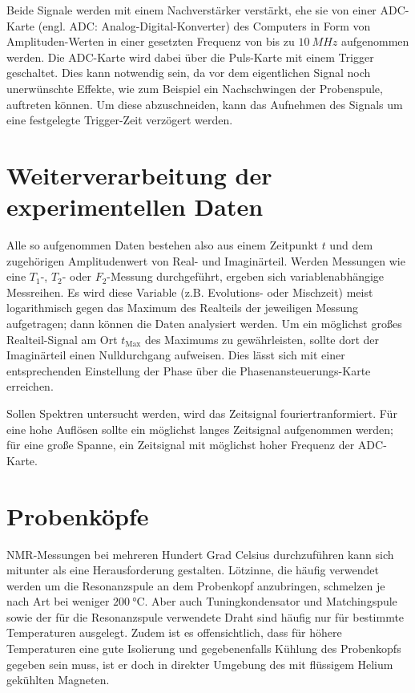 Beide Signale werden mit einem Nachverstärker verstärkt, ehe sie von einer ADC-Karte (engl. ADC: Analog-Digital-Konverter) des Computers in Form von Amplituden-Werten in einer gesetzten Frequenz von bis zu $\SI{10}{MHz}$ aufgenommen werden. Die ADC-Karte wird dabei über die Puls-Karte mit einem Trigger geschaltet. Dies kann notwendig sein, da vor dem eigentlichen Signal noch unerwünschte Effekte, wie zum Beispiel ein Nachschwingen der Probenspule, auftreten können. Um diese abzuschneiden, kann das Aufnehmen des Signals um eine festgelegte Trigger-Zeit verzögert werden.


\section{Weiterverarbeitung der experimentellen Daten} \label{section:exp:weiterverarbeitung}

Alle so aufgenommen Daten bestehen also aus einem Zeitpunkt $t$ und dem zugehörigen Amplitudenwert von Real- und Imaginärteil. Werden Messungen wie eine $T_1$-, $T_2$- oder $F_2$-Messung durchgeführt, ergeben sich variablenabhängige Messreihen. Es wird diese Variable (z.B. Evolutions- oder Mischzeit) meist logarithmisch gegen das Maximum des Realteils der jeweiligen Messung aufgetragen; dann können die Daten analysiert werden. Um ein möglichst großes Realteil-Signal am Ort $t_\text{Max}$ des Maximums zu gewährleisten, sollte dort der Imaginärteil einen Nulldurchgang aufweisen. Dies lässt sich mit einer entsprechenden Einstellung der Phase über die Phasenansteuerungs-Karte erreichen.

Sollen Spektren untersucht werden, wird das Zeitsignal fouriertranformiert. Für eine hohe Auflösen sollte ein möglichst langes Zeitsignal aufgenommen werden; für eine große Spanne, ein Zeitsignal mit möglichst hoher Frequenz der ADC-Karte.



\section{Probenköpfe} \label{section:exp:probenkoepfe}

NMR-Messungen bei mehreren Hundert Grad Celsius durchzuführen kann sich mitunter als eine Herausforderung gestalten. Lötzinne, die häufig verwendet werden um die Resonanzspule an dem Probenkopf anzubringen, schmelzen je nach Art bei weniger $\SI{200}{\degreeCelsius}$. Aber auch Tuningkondensator und Matchingspule sowie der für die Resonanzspule verwendete Draht sind häufig nur für bestimmte Temperaturen ausgelegt. Zudem ist es offensichtlich, dass für höhere Temperaturen eine gute Isolierung und gegebenenfalls Kühlung des Probenkopfs gegeben sein muss, ist er doch in direkter Umgebung des mit flüssigem Helium gekühlten Magneten.


